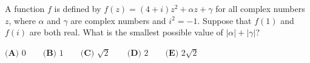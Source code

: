 A function $f$ is defined by $f(z)=(4+i)z^2+\alpha z+\gamma$ for all complex numbers $z$, where $\alpha$ and $\gamma$ are complex numbers and $i^2=-1$. Suppose that $f(1)$ and $f(i)$ are both real. What is the smallest possible value of $|\alpha|+|\gamma|$?

$\textbf{(A) }0\qquad\textbf{(B) }1\qquad\textbf{(C) }\sqrt2\qquad\textbf{(D) }2\qquad\textbf{(E) }2\sqrt2$
